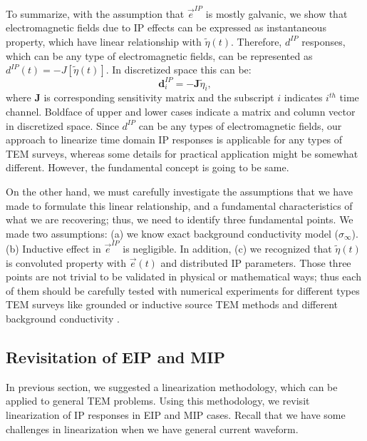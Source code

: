 \documentclass[a4paper, 11pt]{article}
\newcommand{\siginf}{\sigma_\infty}
\newcommand {\e}  { {\vec e} }
\newcommand{\peta}{\tilde{\eta}}
\newcommand{\dip}{d^{IP}}
\begin{document}
To summarize, with the assumption that $\e^{IP}$ is mostly galvanic, we show that electromagnetic fields due to IP effects can be expressed as instantaneous property, which have linear relationship with $\peta(t)$. Therefore, $d^{IP}$ responses, which can be any type of electromagnetic fields, can be represented as $\dip(t) = -J[\peta(t)]$. In discretized space this can be:
\begin{equation}
  \mathbf{d}^{IP}_i = -\mathbf{J}\peta_i,
  \label{eq: dIP_lineareq}
\end{equation}
where $\mathbf{J}$ is corresponding sensitivity matrix and the subscript $i$ indicates $i^{th}$ time channel. Boldface of upper and lower cases indicate a matrix and column vector in discretized space. Since $d^{IP}$ can be any types of electromagnetic fields, our approach to linearize time domain IP responses is applicable for any types of TEM surveys, whereas some details for practical application might be somewhat different. However, the fundamental concept is going to be same.

On the other hand, we must carefully investigate the assumptions that we have made to formulate this linear relationship, and a fundamental characteristics of what we are recovering; thus, we need to identify three fundamental points. We made two assumptions: (a) we know exact background conductivity model ($\siginf$). (b) Inductive effect in $\e^{IP}$ is negligible. In addition, (c) we recognized that $\peta(t)$ is convoluted property with $\e(t)$ and distributed IP parameters. Those three points are not trivial to be validated in physical or mathematical ways; thus each of them should be carefully tested with numerical experiments for different types TEM surveys like grounded or inductive source TEM methods and different background conductivity .

\subsection{Revisitation of EIP and MIP}
In previous section, we suggested a linearization methodology, which can be applied to general TEM problems. Using this methodology, we revisit linearization of IP responses in EIP and MIP cases. Recall that we have some challenges in linearization when we have general current waveform.
\end{document}
